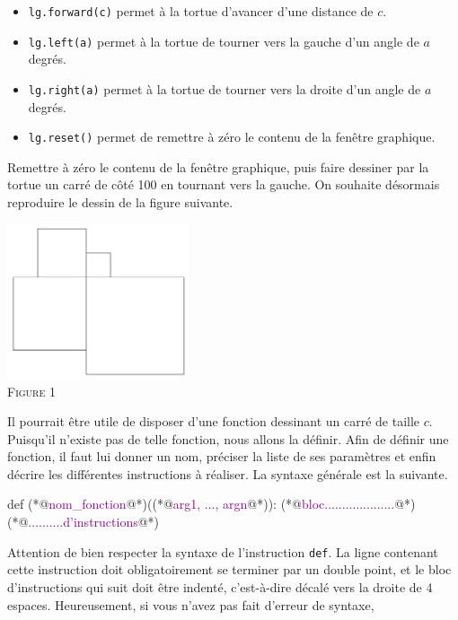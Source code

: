 \documentclass{magnoliaold}
\begin{document}
\begin{itemize}
\item \verb!lg.forward(c)! permet à la tortue d'avancer d'une distance de $c$.
\item \verb!lg.left(a)! permet à la tortue de tourner vers la gauche d'un angle de $a$ degrés.
\item \verb!lg.right(a)! permet à la tortue de tourner vers la droite d'un angle de $a$ degrés.
\item \verb!lg.reset()! permet de remettre à zéro le contenu de la fenêtre graphique.
\end{itemize}

\begin{questions}
\question Remettre à zéro le contenu de la fenêtre graphique, puis faire dessiner par la tortue un carré de côté 100 en tournant vers la gauche.
\enonce On souhaite désormais reproduire le dessin de la figure suivante.
\begin{center}
  \includegraphics[width=0.4\textwidth]{../../commun/images/python-tp-logo-1}\\
  \textsc{Figure 1}
  \end{center}
Il pourrait être utile de disposer d'une fonction dessinant un carré de taille $c$. Puisqu'il n'existe pas de
telle fonction, nous allons la définir. Afin de définir une fonction, il faut lui donner un nom, préciser la
liste de ses paramètres et enfin décrire les différentes instructions à réaliser. La syntaxe générale est
la suivante.
\begin{pythoncode}
def (*@\textcolor{purple}{nom\_fonction}@*)((*@\textcolor{purple}{arg1, ..., argn}@*)):
    (*@\textcolor{purple}{bloc....................}@*)
    (*@\textcolor{purple}{..........d'instructions}@*)
\end{pythoncode}
Attention de bien respecter la syntaxe de l'instruction \verb!def!. La ligne contenant cette instruction
doit obligatoirement se terminer par un double point, et le bloc d'instructions qui suit doit être indenté,
c'est-à-dire décalé vers la droite de 4 espaces. Heureusement, si vous n'avez pas fait d'erreur de syntaxe,

\end{questions}
\end{document}
